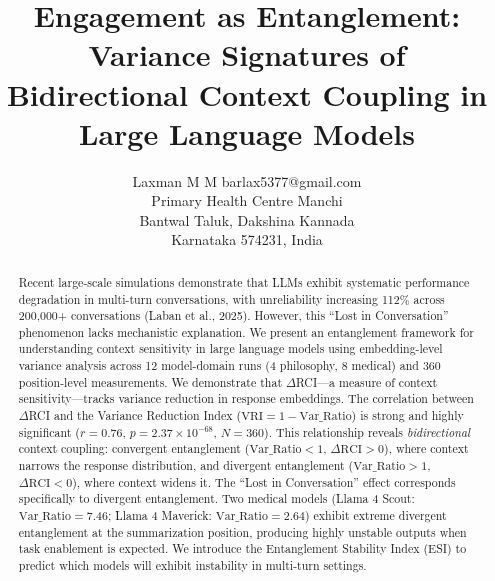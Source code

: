 \documentclass[twoside,11pt]{article}
\begin{document}
\title{Engagement as Entanglement: Variance Signatures of Bidirectional Context Coupling in Large Language Models}

\author{\name Laxman M M \email barlax5377@gmail.com \\
       \addr Primary Health Centre Manchi\\
       Bantwal Taluk, Dakshina Kannada\\
       Karnataka 574231, India}


\maketitle

\begin{abstract}
Recent large-scale simulations demonstrate that LLMs exhibit systematic performance degradation in multi-turn conversations, with unreliability increasing 112\% across 200,000+ conversations (Laban et al., 2025). However, this ``Lost in Conversation'' phenomenon lacks mechanistic explanation. We present an entanglement framework for understanding context sensitivity in large language models using embedding-level variance analysis across 12 model-domain runs (4 philosophy, 8 medical) and 360 position-level measurements. We demonstrate that $\Delta$RCI---a measure of context sensitivity---tracks variance reduction in response embeddings. The correlation between $\Delta$RCI and the Variance Reduction Index ($\text{VRI} = 1 - \text{Var\_Ratio}$) is strong and highly significant ($r = 0.76$, $p = 2.37 \times 10^{-68}$, $N = 360$). This relationship reveals \emph{bidirectional} context coupling: convergent entanglement ($\text{Var\_Ratio} < 1$, $\Delta\text{RCI} > 0$), where context narrows the response distribution, and divergent entanglement ($\text{Var\_Ratio} > 1$, $\Delta\text{RCI} < 0$), where context widens it. The ``Lost in Conversation'' effect corresponds specifically to divergent entanglement. Two medical models (Llama 4 Scout: $\text{Var\_Ratio} = 7.46$; Llama 4 Maverick: $\text{Var\_Ratio} = 2.64$) exhibit extreme divergent entanglement at the summarization position, producing highly unstable outputs when task enablement is expected. We introduce the Entanglement Stability Index (ESI) to predict which models will exhibit instability in multi-turn settings.
\end{abstract}
\end{document}
